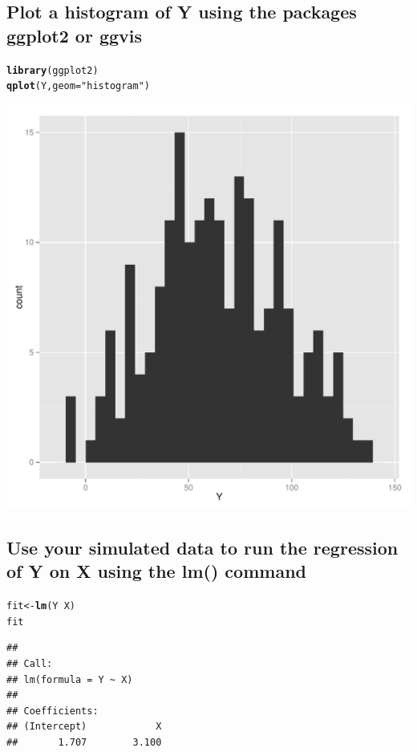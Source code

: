 \documentclass{article}\usepackage[]{graphicx}\usepackage[]{color}
\makeatletter
\def\maxwidth{ %
  \ifdim\Gin@nat@width>\linewidth
    \linewidth
  \else
    \Gin@nat@width
  \fi
}
\newcommand{\hlstr}[1]{\textcolor[rgb]{0.192,0.494,0.8}{#1}}%
\newcommand{\hlopt}[1]{\textcolor[rgb]{0,0,0}{#1}}%
\newcommand{\hlstd}[1]{\textcolor[rgb]{0.345,0.345,0.345}{#1}}%
\newcommand{\hlkwb}[1]{\textcolor[rgb]{0.69,0.353,0.396}{#1}}%
\newcommand{\hlkwc}[1]{\textcolor[rgb]{0.333,0.667,0.333}{#1}}%
\newcommand{\hlkwd}[1]{\textcolor[rgb]{0.737,0.353,0.396}{\textbf{#1}}}%
\newenvironment{kframe}{%
 \def\at@end@of@kframe{}%
 \ifinner\ifhmode%
  \def\at@end@of@kframe{\end{minipage}}%
  \begin{minipage}{\columnwidth}%
 \fi\fi%
 \def\FrameCommand##1{\hskip\@totalleftmargin \hskip-\fboxsep
 \colorbox{shadecolor}{##1}\hskip-\fboxsep
     \hskip-\linewidth \hskip-\@totalleftmargin \hskip\columnwidth}%
 \MakeFramed {\advance\hsize-\width
   \@totalleftmargin\z@ \linewidth\hsize
   \@setminipage}}%
 {\par\unskip\endMakeFramed%
 \at@end@of@kframe}
\newenvironment{knitrout}{}{} %
\makeatother
\begin{document}
\subsection{Plot a histogram of Y using the packages ggplot2 or ggvis}
\begin{knitrout}
\color{fgcolor}\begin{kframe}
\begin{alltt}
\hlkwd{library}\hlstd{(ggplot2)}
\hlkwd{qplot}\hlstd{(Y,} \hlkwc{geom}\hlstd{=}\hlstr{"histogram"}\hlstd{)}
\end{alltt}


{\ttfamily\noindent\itshape\color{messagecolor}{\#\# stat\_bin: binwidth defaulted to range/30. Use 'binwidth = x' to adjust this.}}\end{kframe}
\includegraphics[width=\maxwidth]{figure/unnamed-chunk-14-1} 

\end{knitrout}
\subsection{Use your simulated data to run the regression of Y on X using the lm() command}
\begin{knitrout}
\color{fgcolor}\begin{kframe}
\begin{alltt}
\hlstd{fit} \hlkwb{<-} \hlkwd{lm}\hlstd{(Y} \hlopt{~} \hlstd{X)}
\hlstd{fit}
\end{alltt}
\begin{verbatim}
## 
## Call:
## lm(formula = Y ~ X)
## 
## Coefficients:
## (Intercept)            X  
##       1.707        3.100
\end{verbatim}
\end{kframe}
\end{knitrout}
\end{document}
